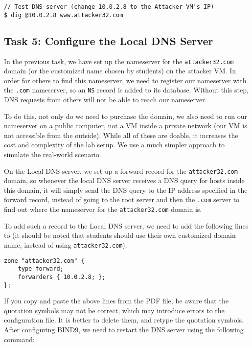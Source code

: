 \begin{lstlisting}
// Test DNS server (change 10.0.2.8 to the Attacker VM's IP)
$ dig @10.0.2.8 www.attacker32.com
\end{lstlisting}



\subsection{Task 5: Configure the Local DNS Server}


In the previous task, we have set up the nameserver for the 
\texttt{attacker32.com} domain (or the customized name chosen
by students) on the attacker VM. In order for others to find
this nameserver, we need to register 
our nameserver with the \texttt{.com} nameserver, so 
an \texttt{NS} record is added to its database. Without this step,
DNS requests from others will not be able to reach our nameserver. 


To do this, not only do we need to purchase the domain, we also need to 
run our nameserver on a public computer, not a VM inside 
a private network (our VM is not 
accessible from the outside). While all of these are doable, it 
increases the cost and complexity of the lab setup. We 
use a much simpler approach to simulate the real-world
scenario. 

On the Local DNS server, we set up a forward record for 
the \texttt{attacker32.com} domain, so  
whenever the local DNS server receives a DNS query for hosts inside this domain, 
it will simply send the DNS query to the IP 
address specified in the forward record, instead of going to the root server
and then the \texttt{.com} server to find out where the nameserver for the 
\texttt{attacker32.com} domain is.  


To add such 
a record to the Local DNS server, 
we need to add the following lines 
to  (it should be noted that students should use 
their own customized domain name, instead of using \texttt{attacker32.com}).

\begin{lstlisting}
zone "attacker32.com" {
    type forward;
    forwarders { 10.0.2.8; };
};
\end{lstlisting}

If you copy and paste the above lines from the PDF file, be aware that the 
quotation symbols may not be correct, which may introduce
errors to the configuration file. It is better to delete them, and 
retype the quotation symbols. After configuring BIND9, 
we need to restart the DNS server using the following command: 



